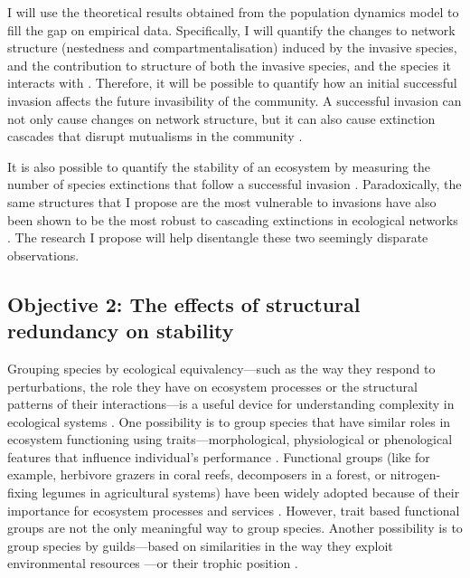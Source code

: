 \documentclass[a4paper]{article}
\begin{document}
I will use the theoretical results obtained from the population dynamics model to fill the gap on empirical data.
Specifically, I will quantify the changes to network structure (nestedness and compartmentalisation) induced by the invasive species, and the contribution to structure of both the invasive species, and the species it interacts with \autocite{Saavedra2011, Stouffer2014}.
Therefore, it will be possible to quantify how an initial successful invasion affects the future invasibility of the community.
A successful invasion can not only cause changes on network structure, but it can also cause extinction cascades that disrupt mutualisms in the community \autocite{Christian2001, RodriguezCabal2013}.

It is also possible to quantify the stability of an ecosystem by measuring the number of species extinctions that follow a successful invasion \autocite{Post1983, Ives2007}.
Paradoxically, the same structures that I propose are the most vulnerable to invasions have also been shown to be the most robust to cascading extinctions in ecological networks \autocite{Tylianakis2010, Stouffer2011, Albrecht2014}.
The research I propose will help disentangle these two seemingly disparate observations.

\subsection*{Objective 2: The effects of structural redundancy on stability}

Grouping species by ecological equivalency---such as the way they respond to perturbations, the role they have on ecosystem processes or the structural patterns of their interactions---is a useful device for understanding complexity in ecological systems \autocite{Naeem1998}.
One possibility is to group species that have similar roles in ecosystem functioning using traits---morphological, physiological or phenological features that influence individual's performance \autocite{Raunkiaer1934, Fonseca2001, Mouillot2013}.
Functional groups (like for example, herbivore grazers in coral reefs, decomposers in a forest, or nitrogen-fixing legumes in agricultural systems) have been widely adopted because of their importance for ecosystem processes and services \autocite{Daz2001, Tilman2001a, Wardle2005}.
However, trait based functional groups are not the only meaningful way to group species.
Another possibility is to group species by guilds---based on similarities in the way they exploit environmental resources \autocite{Root1967}---or their trophic position \autocite{Hairston1960}.
\end{document}
